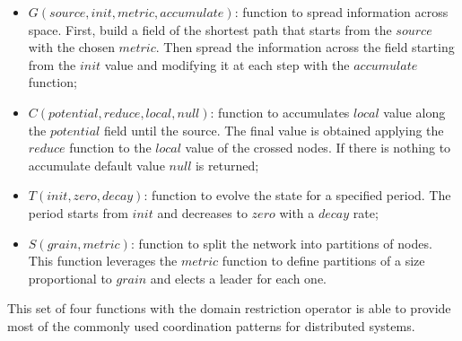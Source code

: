 \begin{itemize}
    \item $G(source, init, metric, accumulate)$: function to spread information across space. First, build a field of the shortest path that starts from the $source$ with the chosen $metric$. Then spread the information across the field starting from the $init$ value and modifying it at each step with the $accumulate$ function;
    \item $C(potential, reduce, local, null)$: function to accumulates $local$ value along the $potential$ field until the source. The final value is obtained applying the $reduce$ function to the $local$ value of the crossed nodes. If there is nothing to accumulate default value $null$ is returned;
    \item $T(init, zero, decay)$: function to evolve the state for a specified period. The period starts from $init$ and decreases to $zero$ with a $decay$ rate;
    \item $S(grain, metric)$: function to split the network into partitions of nodes. This function leverages the $metric$ function to define partitions of a size proportional to $grain$ and elects a leader for each one.
\end{itemize}

This set of four functions with the domain restriction operator is able to provide most of the commonly used coordination patterns for distributed systems. 

